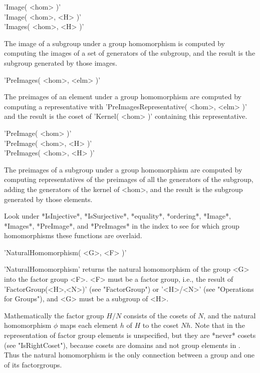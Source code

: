 \vspace{5mm}
'Image( <hom> )'%
\\
'Image( <hom>, <H> )' \\
'Images( <hom>, <H> )'%

The  image  of a  subgroup  under a  group   homomorphism is  computed by
computing the images  of a set  of  generators  of the subgroup, and  the
result is the subgroup generated by those images.

\vspace{5mm}
'PreImages( <hom>, <elm> )'%

The preimages of an  element under a group  homomorphism are  computed by
computing a representative with 'PreImagesRepresentative( <hom>, <elm> )'
and   the result  is the  coset   of  'Kernel(  <hom> )'  containing this
representative.

\vspace{5mm}
'PreImage( <hom> )'%
\\
'PreImage( <hom>, <H> )' \\
'PreImages( <hom>, <H> )'

The preimages of a subgroup  under a group  homomorphism  are computed by
computing representatives of the preimages of  all the generators  of the
subgroup, adding the generators of the kernel of <hom>, and the result is
the subgroup generated by those elements.

Look   under  *IsInjective*,   *IsSurjective*,  *equality*,   *ordering*,
*Image*, *Images*, *PreImage*,  and *PreImages*  in the index  to see for
which group homomorphisms these functions are overlaid.

%
%

'NaturalHomomorphism( <G>, <F> )'

'NaturalHomomorphism' returns  the natural  homomorphism of the group <G>
into the factor group <F>.  <F> must be a factor group, i.e.,  the result
of   'FactorGroup(<H>,<N>)' (see   "FactorGroup")   or   '<H>/<N>'   (see
"Operations for Groups"), and <G> must be a subgroup of <H>.

Mathematically the  factor group $H/N$ consists of the cosets of $N$, and
the natural homomorphism $\phi$ maps each element $h$ of $H$ to the coset
$N h$.  Note  that in {\GAP} the  representation of factor group elements
is unspecified, but they are *never* cosets (see "IsRightCoset"), because
cosets are domains and not  group elements in  {\GAP}.   Thus the natural
homomorphism  is the  only  connection between  a group  and  one of  its
factorgroups.

